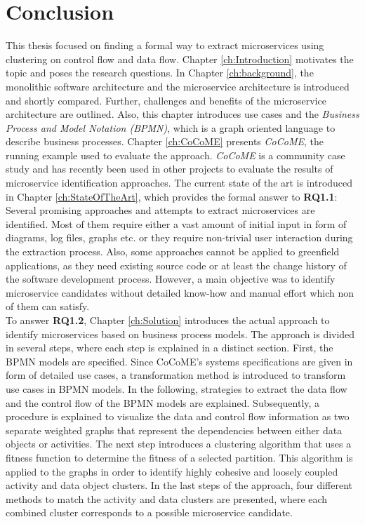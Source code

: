 \chapter{Conclusion}
\label{ch:Conclusion}
This thesis focused on finding a formal way to extract microservices using clustering on control flow and data flow. Chapter \ref{ch:Introduction} motivates the topic and poses the research questions. In Chapter \ref{ch:background}, the monolithic software architecture and the microservice architecture is introduced and shortly compared. Further, challenges and benefits of the microservice architecture are outlined. Also, this chapter introduces use cases and the \textit{Business Process and Model Notation (BPMN)}, which is a graph oriented language to describe business processes. Chapter \ref{ch:CoCoME} presents \textit{CoCoME}, the running example used to evaluate the approach. \textit{CoCoME} is a community case study and has recently been used in other projects to evaluate the results of microservice identification approaches. The current state of the art is introduced in Chapter \ref{ch:StateOfTheArt}, which provides the formal answer to \textbf{RQ1.1}: Several promising approaches and attempts to extract microservices are identified. Most of them require either a vast amount of initial input in form of diagrams, log files, graphs etc. or they require non-trivial user interaction during the extraction process. Also, some approaches cannot be applied to greenfield applications, as they need existing source code or at least the change history of the software development process. However, a main objective was to identify microservice candidates without detailed know-how and manual effort which non of them can satisfy. \\
To answer \textbf{RQ1.2}, Chapter \ref{ch:Solution} introduces the actual approach to identify microservices based on business process models.  The approach is divided in several steps, where each step is explained in a distinct section. First, the BPMN models are specified. Since CoCoME's systems specifications are given in form of detailed use cases, a transformation method is introduced to transform use cases in BPMN models. In the following, strategies to extract the data flow and the control flow of the BPMN models are explained. Subsequently, a procedure is explained to visualize the data and control flow information as two separate weighted graphs that represent the dependencies between either data objects or activities. The next step introduces a clustering algorithm that uses a fitness function to determine the fitness of a selected partition. This algorithm is applied to the graphs in order to identify highly cohesive and loosely coupled activity and data object clusters. In the last steps of the approach, four different methods to match the activity and data clusters are presented, where each combined cluster corresponds to a possible microservice candidate. \\
